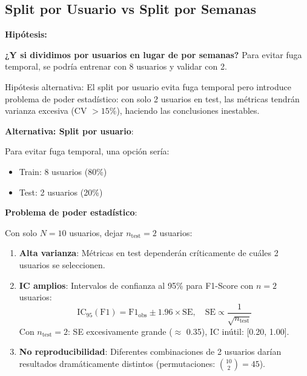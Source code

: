 \documentclass[12pt,letterpaper,twoside]{report}
\begin{document}
\subsection{Split por Usuario vs Split por Semanas}

\begin{hipotesisbox}
\textbf{Hipótesis:}

\textbf{¿Y si dividimos por usuarios en lugar de por semanas?} Para evitar fuga temporal, se podría entrenar con 8 usuarios y validar con 2.

Hipótesis alternativa: El split por usuario evita fuga temporal pero introduce problema de poder estadístico: con solo 2 usuarios en test, las métricas tendrán varianza excesiva (CV $> 15\%$), haciendo las conclusiones inestables.
\end{hipotesisbox}

\begin{estadisticobox}
\textbf{Alternativa: Split por usuario}:

Para evitar fuga temporal, una opción sería:
\begin{itemize}[noitemsep]
    \item Train: 8 usuarios (80\%)
    \item Test: 2 usuarios (20\%)
\end{itemize}

\textbf{Problema de poder estadístico}:

Con solo $N=10$ usuarios, dejar $n_{\text{test}}=2$ usuarios:

\begin{enumerate}[noitemsep]
    \item \textbf{Alta varianza}: Métricas en test dependerán críticamente de cuáles 2 usuarios se seleccionen.
    
    \item \textbf{IC amplios}: Intervalos de confianza al 95\% para F1-Score con $n=2$ usuarios:
    \begin{equation}
    \text{IC}_{95}(\text{F1}) = \text{F1}_{\text{obs}} \pm 1.96 \times \text{SE}, \quad \text{SE} \propto \frac{1}{\sqrt{n_{\text{test}}}}
    \end{equation}
    Con $n_{\text{test}}=2$: SE excesivamente grande ($\approx$ 0.35), IC inútil: [0.20, 1.00].
    
    \item \textbf{No reproducibilidad}: Diferentes combinaciones de 2 usuarios darían resultados dramáticamente distintos (permutaciones: $\binom{10}{2}=45$).
\end{enumerate}
\end{estadisticobox}
\end{document}
